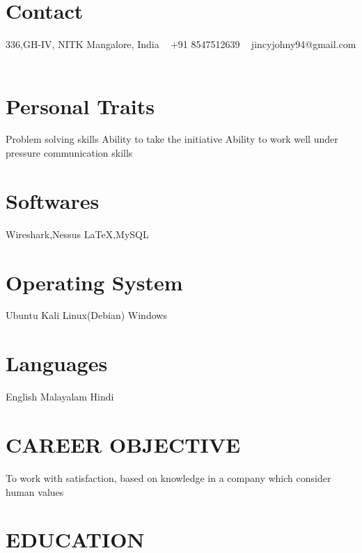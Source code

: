 \documentclass[]{cv-style}          %
\begin{document}


\begin{aside}
%
\section{Contact}
336,GH-IV, NITK
 Mangalore, India 
~
+91 8547512639
~
jincyjohny94@gmail.com
~
%
\section{Personal Traits}
 Problem solving skills
Ability to take the initiative
     Ability to work well under pressure
     communication skills
     ~
%
\section{Softwares}
Wireshark,Nessus
\LaTeX{},MySQL
%
\section{Operating
   System}
   Ubuntu
    Kali Linux(Debian)
Windows
%
\section{Languages}
 English
 Malayalam
 Hindi
%
\end{aside}

\section{CAREER OBJECTIVE}
To work with satisfaction, based on knowledge in a company which consider human values
 \section{EDUCATION}
\end{document}
